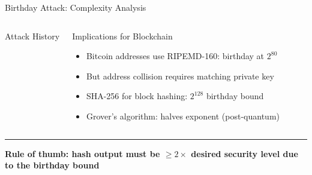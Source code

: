 \documentclass[8pt,aspectratio=169]{beamer}
\newcommand{\bottomnote}[1]{\vfill\vspace{-2mm}\textcolor{mllavender2}{\rule{\textwidth}{0.4pt}}\vspace{1mm}\footnotesize\textbf{#1}}
\begin{document}
\begin{frame}{Birthday Attack: Complexity Analysis}
\begin{columns}
\begin{block}{Attack History}
\end{block}
\begin{block}{Implications for Blockchain}
\begin{itemize}\small
  \item Bitcoin addresses use RIPEMD-160: birthday at $2^{80}$
  \item But address collision requires matching private key
  \item SHA-256 for block hashing: $2^{128}$ birthday bound
  \item Grover's algorithm: halves exponent (post-quantum)
\end{itemize}
\end{block}
\end{columns}
\bottomnote{Rule of thumb: hash output must be $\geq 2\times$ desired security level due to the birthday bound}
\end{frame}
\end{document}
